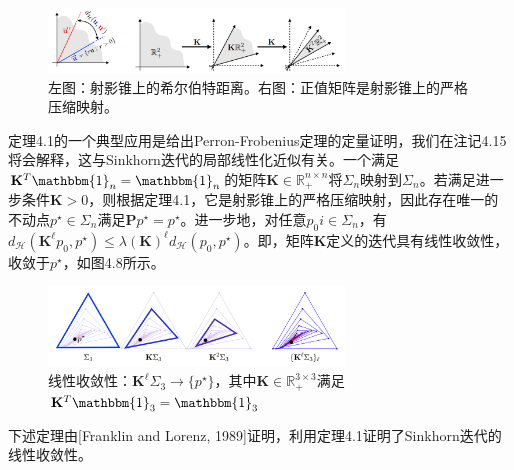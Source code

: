 \documentclass[cn,10pt,math=newtx,citestyle=gb7714-2015,bibstyle=gb7714-2015]{elegantbook}
\begin{document}
\begin{figure}[H]
    \centering
    \includegraphics[width=0.7\textwidth]{figure/fig4.7.png}
    \caption{左图：射影锥上的希尔伯特距离。右图：正值矩阵是射影锥上的严格压缩映射。}
    \label{图4.7}
\end{figure}

\begin{postulate}
定理4.1的一个典型应用是给出Perron-Frobenius定理的定量证明，我们在注记4.15将会解释，这与Sinkhorn迭代的局部线性化近似有关。一个满足$\mathbf{K}^T\mathbbm{1}_n=\mathbbm{1}_n$的矩阵$\mathbf{K}\in\mathbb{R}_+^{n\times n}$将$\Sigma_n$映射到$\Sigma_n$。若满足进一步条件$\mathbf{K}>0$，则根据定理4.1，它是射影锥上的严格压缩映射，因此存在唯一的不动点$p^\star \in \Sigma_n$满足$\mathbf{P}p^\star = p^\star$。进一步地，对任意$p_0i\in\Sigma_n$，有$d_\mathcal{H}(\mathbf{K}^\ell p_0, p^\star) \leq \lambda(\mathbf{K})^\ell d_\mathcal{H}(p_0,p^\star)$。即，矩阵$\mathbf{K}$定义的迭代具有线性收敛性，收敛于$p^\star$，如图4.8所示。
\end{postulate}

\begin{figure}[H]
    \centering
    \includegraphics[width=0.7\textwidth]{figure/fig4.8.png}
    \caption{线性收敛性：$\mathbf{K}^\ell \Sigma_3 \to \{p^\star\}$，其中$\mathbf{K}\in\mathbb{R}_+^{3\times 3}$满足$\mathbf{K}^T\mathbbm{1}_3=\mathbbm{1}_3$}
    \label{图4.8}
\end{figure}

\begin{postulate}[Sinkhorn算法的全局收敛性]
下述定理由[Franklin and Lorenz, 1989]证明，利用定理4.1证明了Sinkhorn迭代的线性收敛性。
\end{postulate}
\end{document}
